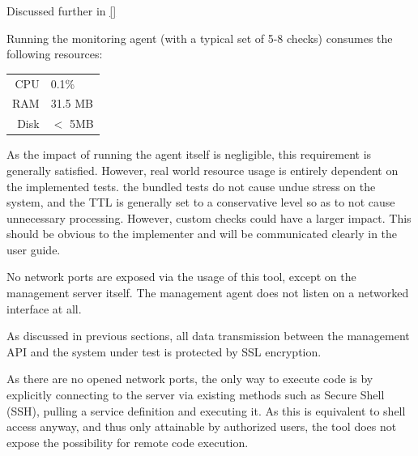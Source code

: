 \documentclass{cshonours}
\begin{document}
\begin{enumerate}
\begin{enumerate}
        Discussed further in \ref{}


        Running the monitoring agent (with a typical set of 5-8 checks) consumes the following resources:
        
        \begin{table}[htbp]
          \centering
        \begin{tabular}{|r|l|}
          CPU & 0.1\% \\
          RAM & 31.5 MB \\
          Disk & $<$ 5MB \\
        \end{tabular}
        \end{table}

        As the impact of running the agent itself is negligible, this requirement is generally satisfied. However, real world resource usage is entirely dependent on the implemented tests. the bundled tests do not cause undue stress on the system, and the TTL is generally set to a conservative level so as to not cause unnecessary processing. However, custom checks could have a larger impact. This should be obvious to the implementer and will be communicated clearly in the user guide.

    \end{enumerate}
    \begin{enumerate}

        No network ports are exposed via the usage of this tool, except on the management server itself. The management agent does not listen on a networked interface at all.


        As discussed in previous sections, all data transmission between the management API and the system under test is protected by SSL encryption.


        As there are no opened network ports, the only way to execute code is by explicitly connecting to the server via existing methods such as Secure Shell (SSH), pulling a service definition and executing it. As this is equivalent to shell access anyway, and thus only attainable by authorized users, the tool does not expose the possibility for remote code execution.


\end{enumerate}
\end{enumerate}
\end{document}
